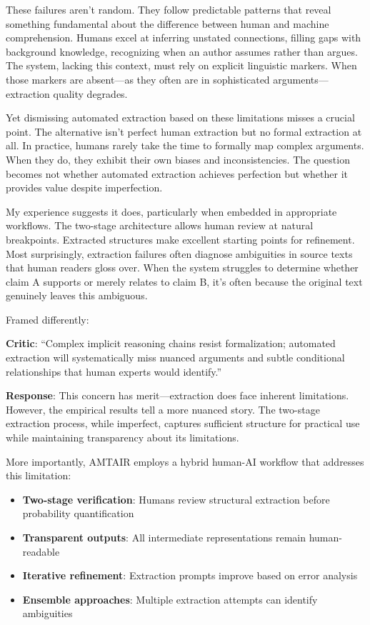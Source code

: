 \documentclass[
  11pt,
  letterpaper,
  openany]{book}
\providecommand{\tightlist}{%
  \setlength{\itemsep}{0pt}\setlength{\parskip}{0pt}}
\begin{document}
These failures aren't random. They follow predictable patterns that
reveal something fundamental about the difference between human and
machine comprehension. Humans excel at inferring unstated connections,
filling gaps with background knowledge, recognizing when an author
assumes rather than argues. The system, lacking this context, must rely
on explicit linguistic markers. When those markers are absent---as they
often are in sophisticated arguments---extraction quality degrades.

Yet dismissing automated extraction based on these limitations misses a
crucial point. The alternative isn't perfect human extraction but no
formal extraction at all. In practice, humans rarely take the time to
formally map complex arguments. When they do, they exhibit their own
biases and inconsistencies. The question becomes not whether automated
extraction achieves perfection but whether it provides value despite
imperfection.

My experience suggests it does, particularly when embedded in
appropriate workflows. The two-stage architecture allows human review at
natural breakpoints. Extracted structures make excellent starting points
for refinement. Most surprisingly, extraction failures often diagnose
ambiguities in source texts that human readers gloss over. When the
system struggles to determine whether claim A supports or merely relates
to claim B, it's often because the original text genuinely leaves this
ambiguous.

Framed differently:

\textbf{Critic}: ``Complex implicit reasoning chains resist
formalization; automated extraction will systematically miss nuanced
arguments and subtle conditional relationships that human experts would
identify.''

\textbf{Response}: This concern has merit---extraction does face
inherent limitations. However, the empirical results tell a more nuanced
story. The two-stage extraction process, while imperfect, captures
sufficient structure for practical use while maintaining transparency
about its limitations.

More importantly, AMTAIR employs a hybrid human-AI workflow that
addresses this limitation:

\begin{itemize}
\tightlist
\item
  \textbf{Two-stage verification}: Humans review structural extraction
  before probability quantification
\item
  \textbf{Transparent outputs}: All intermediate representations remain
  human-readable
\item
  \textbf{Iterative refinement}: Extraction prompts improve based on
  error analysis
\item
  \textbf{Ensemble approaches}: Multiple extraction attempts can
  identify ambiguities
\end{itemize}
\end{document}

